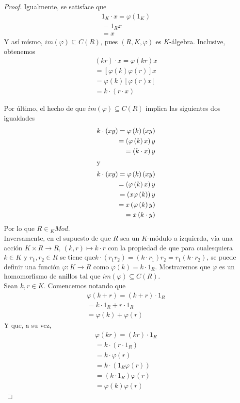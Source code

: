 \documentclass{article}
\newcommand{\lrprth}[1]{
    \left(#1\right)
}
\newcommand{\ringcenter}[1]{
    C\lrprth{#1}
}
\theoremstyle{definition}
\theoremstyle{plain}
\theoremstyle{plain}
\theoremstyle{definition}
\theoremstyle{definition}
\theoremstyle{definition}
\theoremstyle{definition}
\theoremstyle{definition}
\theoremstyle{definition}
\begin{document}
\begin{enumerate}
\begin{proof}
Igualmente, se satisface que
\begin{align*}
1_{K} \cdot x = \varphi\lrprth{1_{K}}\\
=1_{R}x\\
=x
\end{align*}
Y así mísmo, $im\lrprth{ \varphi } \subseteq \ringcenter{R}$, pues $\lrprth{R,K, \varphi }$ es $K$-álgebra. Inclusive, obtenemos
\begin{align*}
\lrprth{kr} \cdot x = \varphi \lrprth{kr}x\\
= [ \varphi \lrprth{k} \varphi \lrprth{r} ]x\\
= \varphi \lrprth{k} [ \varphi \lrprth{r}x ]\\
= k \cdot \lrprth{r \cdot x}
\end{align*}
	
Por último, el hecho de que $im\lrprth{ \varphi } \subseteq \ringcenter{R}$ implica las siguientes dos igualdades
\begin{align*}
k \cdot \lrprth{xy}=\varphi \lrprth{k}\lrprth{xy}\\
=\lrprth{ \varphi \lrprth{k}x}y\\
=\lrprth{k \cdot x}y\\
\intertext{y}
k \cdot \lrprth{xy} = \varphi \lrprth{k}\lrprth{xy}\\
=\lrprth{ \varphi \lrprth{k}x}y
\\=\lrprth{x \varphi \lrprth{k}}y\\
=x\lrprth{ \varphi \lrprth{k}y}\\
=x\lrprth{k \cdot y}
\end{align*}
Por lo que $R \in {}_{K}Mod$.\\
	
Inversamente, en el supuesto de que $R$ sea un $K$-módulo a izquierda, vía una acción $K \times R \longrightarrow R$, $\lrprth{k,r} \mapsto k \cdot r$ con la propiedad de que para cualesquiera $k \in K$ y $r_{1},r_{2} \in R$ se tiene que$k \cdot \lrprth{r_{1}r_{2}} = \lrprth{k \cdot r_{1}}r_{2} = r_{1} \lrprth{k \cdot r_{2}}$, se puede definir una función $\varphi : K \longrightarrow R$ como $\varphi \lrprth{k} = k \cdot 1_{R}$. Mostraremos que $\varphi$ es un homomorfismo de anillos tal que $im\lrprth{ \varphi } \subseteq \ringcenter{R}$.\\
	
Sean $k,r \in K$. Comencemos notando que
\begin{align*}
\varphi \lrprth{k+r}=\lrprth{k+r}\cdot 1_{R}\\
=k \cdot 1_{R}+r \cdot 1_{R}\\
=\varphi\lrprth{k}+\varphi\lrprth{r}
\end{align*}
Y que, a su vez,
\begin{align*}
\varphi \lrprth{kr} = \lrprth{kr} \cdot 1_{R}\\
= k \cdot \lrprth{r \cdot 1_{R}}\\
= k \cdot \varphi \lrprth{r}\\
= k \cdot \lrprth{1_{R} \varphi \lrprth{r}}\\
= \lrprth{k \cdot 1_{R}} \varphi \lrprth{r}\\
= \varphi \lrprth{k} \varphi \lrprth{r}
\end{align*}


\end{proof}
\end{enumerate}
\end{document}
